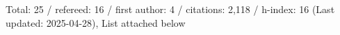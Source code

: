 Total: 25 / refereed: 16 / first author: 4 / citations: 2,118 / h-index: 16 (Last updated: 2025-04-28), List attached below